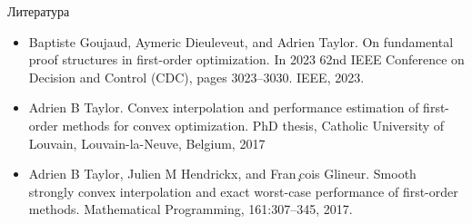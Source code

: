 \documentclass{beamer}
\begin{document}
 \begin{frame}{Литература}

\begin{itemize}
 \item Baptiste Goujaud, Aymeric Dieuleveut, and Adrien Taylor. On fundamental proof structures in first-order
optimization. In 2023 62nd IEEE Conference on Decision and Control (CDC), pages 3023–3030. IEEE,
2023.
 \item Adrien B Taylor. Convex interpolation and performance estimation of first-order methods for convex optimization. PhD thesis, Catholic University of Louvain, Louvain-la-Neuve, Belgium, 2017
 \item Adrien B Taylor, Julien M Hendrickx, and Fran ̧cois Glineur. Smooth strongly convex interpolation and exact worst-case performance of first-order methods. Mathematical Programming, 161:307–345, 2017.
\end{itemize}

 \end{frame}
\end{document}
